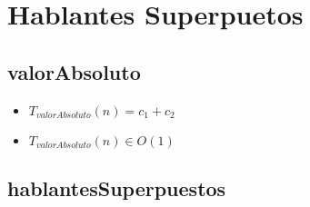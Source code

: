 \documentclass{article}
\begin{document}
    \section*{Hablantes Superpuetos}

    \subsection*{valorAbsoluto}

    \begin{minipage}{0.70\textwidth}
        
    \end{minipage}
    \hfill
    \begin{minipage}{0.25\textwidth}
    \end{minipage}

    \begin{itemize}
        \item $T_{valorAbsoluto}(n) = c_1 + c_2$
        \item $T_{valorAbsoluto}(n) \in O(1)$
    \end{itemize}

    \subsection*{hablantesSuperpuestos}
\end{document}
